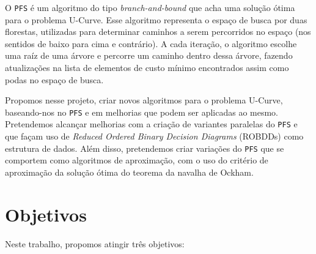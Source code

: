 \documentclass[12pt]{article}
\begin{document}
O {\tt PFS} é um algoritmo do tipo {\em branch-and-bound} que acha uma
solução ótima para o problema U-Curve. Esse algoritmo representa o 
espaço de busca por duas florestas, utilizadas para determinar caminhos 
a serem percorridos no espaço (nos sentidos de baixo para cima
e contrário). A cada iteração, o algoritmo escolhe uma raíz de uma 
árvore e percorre um caminho dentro dessa árvore, fazendo atualizações
na lista de elementos de custo mínimo encontrados assim como podas no
espaço de busca.

Propomos nesse projeto, criar novos algoritmos para o problema
U-Curve, baseando-nos no {\tt PFS} e em melhorias que podem ser 
aplicadas ao mesmo. Pretendemos alcançar melhorias com a criação
de variantes paralelas do {\tt PFS} e que façam uso de {\em Reduced 
Ordered Binary Decision Diagrams} (ROBDDs) como estrutura de 
dados. Além disso, pretendemos criar variações do {\tt PFS} que se
comportem como algoritmos de aproximação, com o uso do critério de 
aproximação da solução ótima do teorema da navalha de Ockham.


\section{Objetivos}
Neste trabalho, propomos atingir três objetivos:
\end{document}
